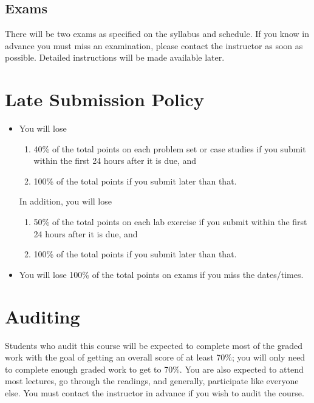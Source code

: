 \documentclass[11pt, a4paper]{article}
\begin{document}
\subsection{Exams}
There will be two exams as specified on the syllabus and schedule. If you know in advance you must miss an examination, please contact the instructor as soon as possible. Detailed instructions will be made available later.


\section{Late Submission Policy} 
\begin{itemize}
	\item You will lose
	\begin{enumerate}
		\item 40\% of the total points on each problem set or case studies if you submit within the first 24 hours after it is due, and
		\item 100\% of the total points if you submit later than that.
	\end{enumerate}
	
	In addition, you will lose 
	\begin{enumerate}
		\item 50\% of the total points on each lab exercise if you submit within the first 24 hours after it is due, and
		\item 100\% of the total points if you submit later than that.
	\end{enumerate}
	
	\item You will lose 100\% of the total points on exams if you miss the dates/times.
\end{itemize}


\section{Auditing}
Students who audit this course will be expected to complete most of the graded work with the goal of getting an overall score of at least 70\%; you will only need to complete enough graded work to get to 70\%. You are also expected to attend most lectures, go through the readings, and generally, participate like everyone else. You must contact the instructor in advance if you wish to audit the course.
\end{document}
